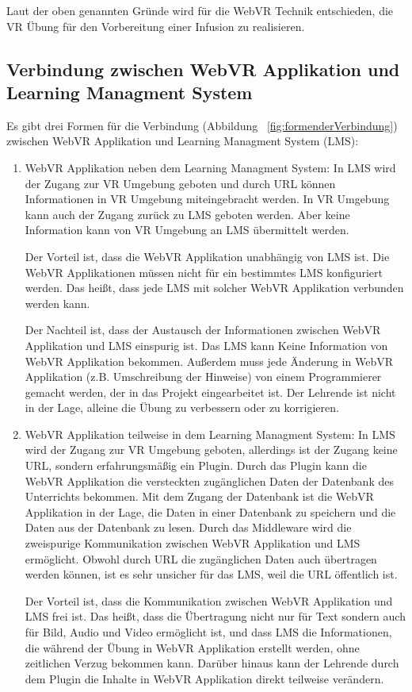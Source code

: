  Laut der oben genannten Gründe wird für die WebVR Technik entschieden, die VR Übung für den Vorbereitung einer Infusion zu realisieren.

 \subsection{Verbindung zwischen WebVR Applikation und Learning Managment System}
 Es gibt drei Formen für die Verbindung (Abbildung ~\ref{fig:formenderVerbindung}) zwischen WebVR Applikation und Learning Managment System (LMS):
 \begin{enumerate}
   \item WebVR Applikation neben dem Learning Managment System:
     \subitem In LMS wird der Zugang zur VR Umgebung geboten und durch URL können Informationen in VR Umgebung miteingebracht werden. In VR Umgebung kann auch der Zugang zurück zu LMS geboten werden. Aber keine Information kann von VR Umgebung an LMS übermittelt werden.
     
     Der Vorteil ist, dass die WebVR Applikation unabhängig von LMS ist. Die WebVR Applikationen müssen nicht für ein bestimmtes LMS konfiguriert werden. Das heißt, dass jede LMS mit solcher WebVR Applikation verbunden werden kann.
     
     Der Nachteil ist, dass der Austausch der Informationen zwischen WebVR Applikation und LMS einspurig ist. Das LMS kann Keine Information von WebVR Applikation bekommen. Außerdem muss jede Änderung in WebVR Applikation (z.B. Umschreibung der Hinweise) von einem Programmierer gemacht werden, der in das Projekt eingearbeitet ist. Der Lehrende ist nicht in der Lage, alleine die Übung zu verbessern oder zu korrigieren.
     
   \item WebVR Applikation teilweise in dem Learning Managment System:
     \subitem In LMS wird der Zugang zur VR Umgebung geboten, allerdings ist der Zugang keine URL, sondern erfahrungsmäßig ein Plugin. Durch das Plugin kann die WebVR Applikation die versteckten zugänglichen Daten der Datenbank des Unterrichts bekommen. Mit dem Zugang der Datenbank ist die WebVR Applikation in der Lage, die Daten in einer Datenbank zu speichern und die Daten aus der Datenbank zu lesen. Durch das Middleware wird die zweispurige Kommunikation zwischen WebVR Applikation und LMS ermöglicht. Obwohl durch URL die zugänglichen Daten auch übertragen werden können, ist es sehr unsicher für das LMS, weil die URL öffentlich ist.
     
     Der Vorteil ist, dass die Kommunikation zwischen WebVR Applikation und LMS frei ist. Das heißt, dass die Übertragung nicht nur für Text sondern auch für Bild, Audio und Video ermöglicht ist, und dass LMS die Informationen, die während der Übung in WebVR Applikation erstellt werden, ohne zeitlichen Verzug bekommen kann. Darüber hinaus kann der Lehrende durch dem Plugin die Inhalte in WebVR Applikation direkt teilweise verändern.
     

\end{enumerate}
